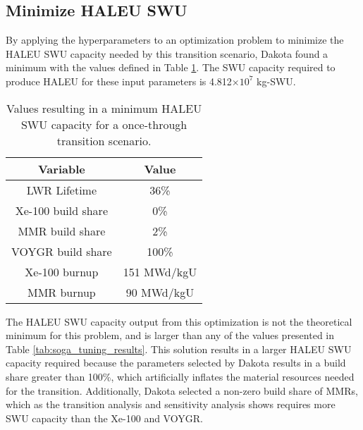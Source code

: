 \subsection{Minimize HALEU SWU}
By applying the hyperparameters to an optimization problem to minimize the 
\gls{HALEU} \gls{SWU} capacity needed by this transition scenario, Dakota
found a minimum with the values defined in Table \ref{tab:soga_ot_haleu}.
The \gls{SWU} capacity required to produce \gls{HALEU} for these input 
parameters is 4.812$\times 10^7$ kg-SWU.

\begin{table}
    \centering 
    \caption{Values resulting in a minimum \gls{HALEU} \gls{SWU} capacity for 
              a once-through transition scenario.}
    \label{tab:soga_ot_haleu}
    \begin{tabular}{c c}
        \hline
        Variable & Value \\
        \hline
        LWR Lifetime & 36\%\\
        Xe-100 build share & 0\%\\
        MMR build share & 2\%\\
        VOYGR build share & 100\%\\
        Xe-100 burnup & 151 MWd/kgU\\
        MMR burnup & 90 MWd/kgU\\
        \hline
    \end{tabular}
\end{table}

The \gls{HALEU} \gls{SWU} capacity output from this optimization is not the
theoretical minimum for this problem, and is larger than any of the values 
presented in Table \ref{tab:soga_tuning_results}. This solution results in 
a larger \gls{HALEU} \gls{SWU} capacity required because the parameters selected 
by Dakota results in a build share greater than 100\%, which artificially 
inflates the material resources needed for the transition. Additionally, 
Dakota selected a non-zero build share of \glspl{MMR}, which as the transition 
analysis and sensitivity analysis shows requires more \gls{SWU} capacity than 
the Xe-100 and VOYGR. 

